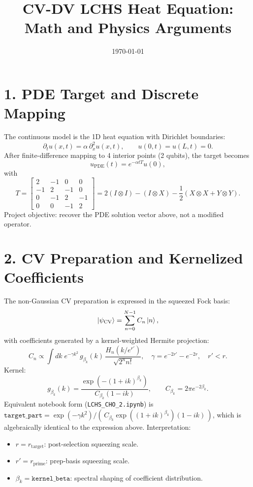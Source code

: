 \documentclass[11pt]{article}
\title{CV-DV LCHS Heat Equation: Math and Physics Arguments}
\date{\today}
\begin{document}
\maketitle

\section*{1. PDE Target and Discrete Mapping}
The continuous model is the 1D heat equation with Dirichlet boundaries:
\begin{equation}
\partial_t u(x,t)=\alpha\,\partial_x^2 u(x,t), \qquad u(0,t)=u(L,t)=0.
\end{equation}
After finite-difference mapping to 4 interior points (2 qubits), the target becomes
\begin{equation}
u_{\mathrm{PDE}}(t)=e^{-\alpha t T}u(0),
\end{equation}
with
\begin{equation}
T=
\begin{bmatrix}
2 & -1 & 0 & 0\\
-1 & 2 & -1 & 0\\
0 & -1 & 2 & -1\\
0 & 0 & -1 & 2
\end{bmatrix}
=2(I\otimes I)-(I\otimes X)-\frac12(X\otimes X+Y\otimes Y).
\end{equation}
Project objective: recover the PDE solution vector above, not a modified operator.

\section*{2. CV Preparation and Kernelized Coefficients}
The non-Gaussian CV preparation is expressed in the squeezed Fock basis:
\begin{equation}
\ket{\psi_{\mathrm{CV}}}=\sum_{n=0}^{N-1} C_n \ket{n},
\end{equation}
with coefficients generated by a kernel-weighted Hermite projection:
\begin{equation}
C_n \propto \int dk\;
e^{-\gamma k^2}\,g_{\beta_k}(k)\,
\frac{H_n(k/e^{r'})}{\sqrt{2^n n!}},
\quad
\gamma=e^{-2r'}-e^{-2r},\quad r'<r.
\end{equation}
Kernel:
\begin{equation}
g_{\beta_k}(k)=\frac{\exp\!\left(-(1+ik)^{\beta_k}\right)}{C_{\beta_k}(1-ik)},
\qquad
C_{\beta_k}=2\pi e^{-2\beta_k}.
\end{equation}
Equivalent notebook form (\texttt{LCHS\_CHO\_2.ipynb}) is
\(\texttt{target\_part}=\exp(-\gamma k^2)/(\,C_{\beta_k}\exp((1+ik)^{\beta_k})(1-ik)\,)\),
which is algebraically identical to the expression above.
Interpretation:
\begin{itemize}
\item $r=r_{\mathrm{target}}$: post-selection squeezing scale.
\item $r'=r_{\mathrm{prime}}$: prep-basis squeezing scale.
\item $\beta_k=\texttt{kernel\_beta}$: spectral shaping of coefficient distribution.
\end{itemize}
\end{document}
